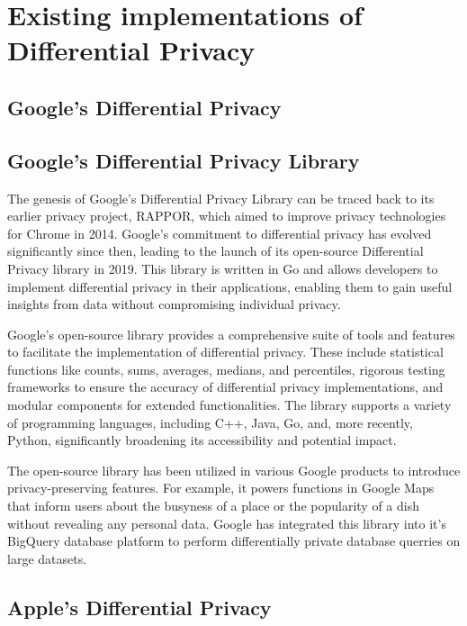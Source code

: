 \section{Existing implementations of Differential Privacy}

\subsection{Google's Differential Privacy}
\subsection{Google's Differential Privacy Library}

The genesis of Google's Differential Privacy Library can be traced back to its earlier privacy project, RAPPOR, which aimed to improve privacy technologies for Chrome in 2014. Google's commitment to differential privacy has evolved significantly since then, leading to the launch of its open-source Differential Privacy library in 2019. This library is written in Go and allows developers to implement differential privacy in their applications, enabling them to gain useful insights from data without compromising individual privacy.\cite{Guevara_2022,RAPPOR}

Google's open-source library provides a comprehensive suite of tools and features to facilitate the implementation of differential privacy. These include statistical functions like counts, sums, averages, medians, and percentiles, rigorous testing frameworks to ensure the accuracy of differential privacy implementations, and modular components for extended functionalities. The library supports a variety of programming languages, including C++, Java, Go, and, more recently, Python, significantly broadening its accessibility and potential impact.\cite{RAPPOR}

The open-source library has been utilized in various Google products to introduce privacy-preserving features. For example, it powers functions in Google Maps that inform users about the busyness of a place or the popularity of a dish without revealing any personal data. Google has integrated this library into it's BigQuery database platform to perform differentially private database querries on large datasets.\cite{Google_BigQuery}

\subsection{Apple's Differential Privacy}

